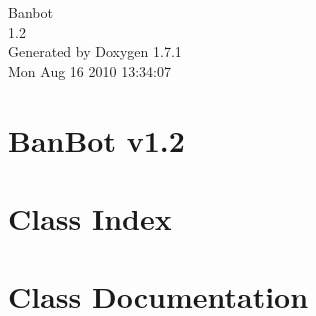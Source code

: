\documentclass[a4paper]{book}
\begin{document}
\hypersetup{pageanchor=false}
\begin{titlepage}
\vspace*{7cm}
\begin{center}
{\Large Banbot \\[1ex]\large 1.2 }\\
\vspace*{1cm}
{\large Generated by Doxygen 1.7.1}\\
\vspace*{0.5cm}
{\small Mon Aug 16 2010 13:34:07}\\
\end{center}
\end{titlepage}
\clearemptydoublepage
{}
\tableofcontents
\clearemptydoublepage
{}
\hypersetup{pageanchor=true}
\chapter{BanBot v1.2}
\label{index}\hypertarget{index}{}
\chapter{Class Index}

\chapter{Class Documentation}












\printindex
\end{document}
